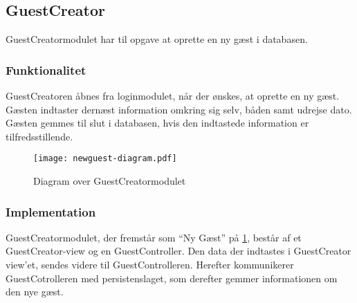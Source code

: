 \subsection{GuestCreator}
\label{sub:GuestCreator}

GuestCreatormodulet har til opgave at oprette en ny gæst i databasen.

\subsubsection{Funktionalitet}
\label{ssub:GuestCreator_funktionalitet}
GuestCreatoren åbnes fra loginmodulet, når der ønskes, at oprette en ny gæst. Gæsten indtaster dernæst information omkring sig selv, båden samt udrejse dato. Gæsten gemmes til slut i databasen, hvis den indtastede information er tilfredsstillende.

\begin{figure}
  \centering
  \texttt{[image: newguest-diagram.pdf]}
  \caption{Diagram over GuestCreatormodulet}
  \label{fig:guestcreator}
\end{figure}

\subsubsection{Implementation}
\label{ssub:GuestCreator_implementation}

GuestCreatormodulet, der fremstår som \enquote{Ny Gæst} på \cref{fig:guestcreator}, består af et GuestCreator-view og en GuestController. Den data der indtastes i GuestCreator view'et, sendes videre til GuestControlleren. Herefter kommunikerer GuestCotrolleren med persistenslaget, som derefter gemmer informationen om den nye gæst.